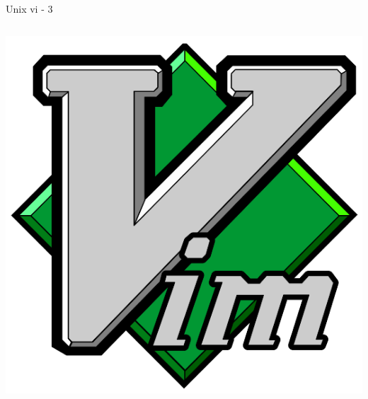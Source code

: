 \documentclass[unknownkeysallowed, 10pt, a4 paper, handout]{beamer}
\begin{document}
\begin{frame}[label=vim3]{Unix vi - 3}
\begin{columns}[T]
\begin{column}{.25\textwidth}
      \includegraphics[scale=0.08]{pics/vim.png}
    \end{column}
  \end{columns}
\end{frame}
\end{document}
